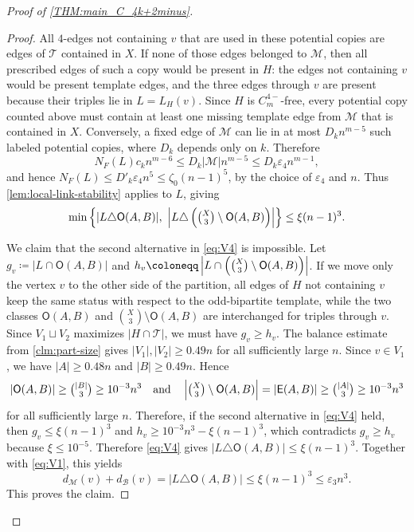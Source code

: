 \documentclass[10pt,a4paper]{article}
\theoremstyle{plain}
\theoremstyle{definition}
\begin{document}
\begin{proof}[Proof of \cref{THM:main_C_4k+2minus}]
\begin{proof}
All $4$-edges not containing $v$ that are used in these potential copies are edges of $\mathcal T$ contained in $X$. If none of those edges belonged to $\mathcal M$, then all prescribed edges of such a copy would be present in $H$: the edges not containing $v$ would be present template edges, and the three edges through $v$ are present because their triples lie in $L=L_H(v)$. Since $H$ is $C_m^{4-}$-free, every potential copy counted above must contain at least one missing template edge from $\mathcal M$ that is contained in $X$. Conversely, a fixed edge of $\mathcal M$ can lie in at most $D_k n^{m-5}$ such labeled potential copies, where $D_k$ depends only on $k$. Therefore 
\[
N_F(L)c_k n^{m-6}
\le D_k|\mathcal M|n^{m-5}
\le D_k\varepsilon_4 n^{m-1},
\]
and hence $N_F(L)\le D'_k\varepsilon_4 n^5\le \zeta_0(n-1)^5$, by the choice of $\varepsilon_4$ and $n$. Thus \cref{lem:local-link-stability} applies to $L$, giving
\begin{equation}\label{eq:V4}
\min\left\{|L\triangle\mathsf O(A,B)|,~
\left|L\triangle\left(\tbinom X3\setminus\mathsf O(A,B)\right)\right|\right\}
\le \xi(n-1)^3.
\end{equation}

We claim that the second alternative in \eqref{eq:V4} is impossible. Let $g_v\coloneqq|L\cap\mathsf O(A,B)|$ and $h_v\coloneqq\left|L\cap\left(\tbinom X3\setminus\mathsf O(A,B)\right)\right|$. 
If we move only the vertex $v$ to the other side of the partition, all edges of $H$ not containing $v$ keep the same status with respect to the odd-bipartite template, while the two classes $\mathsf O(A,B)$ and $\binom X3\setminus\mathsf O(A,B)$ are interchanged for triples through $v$. Since $V_1\sqcup V_2$ maximizes $|H\cap \mathcal T|$, we must have $g_v\ge h_v$.
The balance estimate from \cref{clm:part-size} gives $|V_1|,|V_2|\ge0.49n$ for all sufficiently large $n$. Since $v\in V_1$, we have $|A|\ge0.48n$ and $|B|\ge0.49n$. Hence
\[
|\mathsf O(A,B)|\ge \tbinom{|B|}{3}\ge10^{-3}n^3
\quad\text{and}\quad
\left|\tbinom X3\setminus\mathsf O(A,B)\right|=|\mathsf E(A,B)|\ge \tbinom{|A|}{3}\ge10^{-3}n^3
\]
for all sufficiently large $n$. Therefore, if the second alternative in \eqref{eq:V4} held, then $g_v\le \xi(n-1)^3$ and $h_v\ge 10^{-3}n^3-\xi(n-1)^3$, which contradicts $g_v\ge h_v$ because $\xi\le10^{-5}$. Therefore \eqref{eq:V4} gives $|L\triangle\mathsf O(A,B)|\le \xi(n-1)^3$.
Together with \eqref{eq:V1}, this yields
\[
d_{\mathcal M}(v)+d_{\mathcal B}(v)=|L\triangle\mathsf O(A,B)|
\le \xi(n-1)^3
\le \varepsilon_3n^3.
\]
This proves the claim.
\end{proof}


\end{proof}
\end{document}
